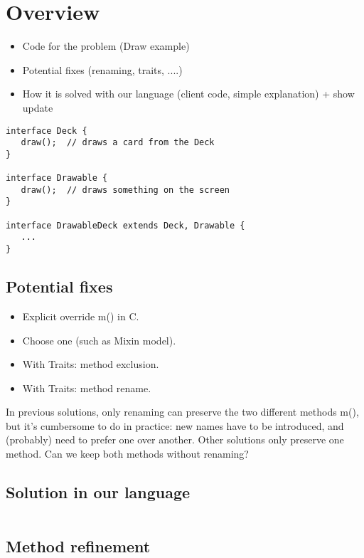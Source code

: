 \section{Overview}

\begin{itemize}
	\item Code for the problem (Draw example)
	\item Potential fixes (renaming, traits, ....)
	\item How it is solved with our language (client code, simple explanation) + show update
\end{itemize}

\begin{lstlisting}
interface Deck {
   draw();  // draws a card from the Deck
}

interface Drawable {
   draw();  // draws something on the screen
}

interface DrawableDeck extends Deck, Drawable {
   ...
} 
\end{lstlisting}

\subsection{Potential fixes}

\begin{itemize}
    \item Explicit override m() in C.
    \item Choose one (such as Mixin model).
    \item With Traits: method exclusion.
    \item With Traits: method rename.
\end{itemize}
In previous solutions, only renaming can preserve the two different methods m(), 
but it’s cumbersome to do in practice: new names have to be introduced, and (probably) need to prefer one over another. 
Other solutions only preserve one method. Can we keep both methods without renaming?

\subsection{Solution in our language}
\begin{lstlisting}

\end{lstlisting}

\subsection{Method refinement}

